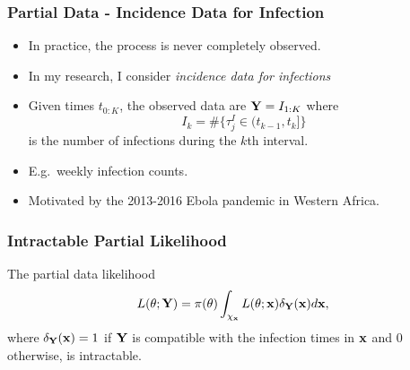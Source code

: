 \documentclass{beamer}
\begin{document}
\begin{frame} \frametitle{Partial Data - Incidence Data for Infection}  
	
	\begin{itemize}
		\item In practice, the process is never completely observed.
		\item In my research, I consider \textit{incidence data for infections}
		\item Given times $t_{0:K}$, the observed data are $\mathbf{Y} = I_{1:K}$ where 
		$$I_k = \#\{\tau^I_j \in (t_{k-1}, t_k]\}$$
		is the number of infections during the $k$th interval.
		\item E.g.\ weekly infection counts.
		\item Motivated by the 2013-2016 Ebola pandemic in Western Africa.
	\end{itemize}
\end{frame}

\begin{frame} \frametitle{Intractable Partial Likelihood}
	
	The partial data likelihood
	\begin{equation*}
	L(\theta; \mathbf{Y}) = \pi(\theta) \int_{\chi_{\mathbf{x}}} L(\theta; \mathbf{x}) \delta_{\mathbf{Y}}(\mathbf{x}) d\mathbf{x},
	\end{equation*}
	where $\delta_{\mathbf{Y}}(\mathbf{x}) = 1$ if $\mathbf{Y}$ is compatible with the infection times in $\mathbf{x}$ and $0$ otherwise,
	is intractable.
	
\end{frame}
\end{document}
